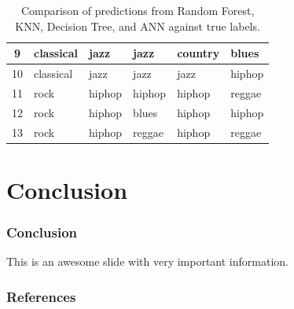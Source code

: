 \documentclass[10pt, aspectratio=169]{beamer}
\begin{document}
\begin{frame}
\begin{table}[h!]
{\begin{tabular}{|c|l|l|l|l|l|}
        9                  & classical           & \cellcolor{red!30}jazz            & \cellcolor{red!30}jazz   & \cellcolor{red!30}country         & \cellcolor{red!30}blues \\ \hline
        10                 & classical           & \cellcolor{red!30}jazz            & \cellcolor{red!30}jazz   & \cellcolor{red!30}jazz            & \cellcolor{red!30}hiphop \\ \hline
        11                 & rock                & \cellcolor{red!30}hiphop          & \cellcolor{red!30}hiphop & \cellcolor{red!30}hiphop          & \cellcolor{red!30}reggae \\ \hline
        12                 & rock                & \cellcolor{red!30}hiphop          & \cellcolor{red!30}blues  & \cellcolor{red!30}hiphop          & \cellcolor{red!30}hiphop \\ \hline
        13                 & rock                & \cellcolor{red!30}hiphop          & \cellcolor{red!30}reggae & \cellcolor{red!30}hiphop          & \cellcolor{red!30}reggae \\ \hline
        \end{tabular}
}
        \caption{Comparison of predictions from Random Forest, KNN, Decision Tree, and ANN against true labels.}
        \label{tab:model_predictions}
        \end{table}
\end{frame}
\section{Conclusion}
\begin{frame}
    \frametitle{Conclusion}
    \begin{outline}
        \1 This is an awesome slide with very important information. 
    \end{outline}
\end{frame}
\begin{frame}
    \frametitle{References}
    {\scriptsize
    
    
    }
\end{frame}
\end{document}
